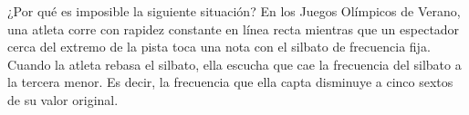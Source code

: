 \item ¿Por qué es imposible la siguiente situación? En los Juegos Olímpicos de Verano, una atleta corre con rapidez constante en línea recta mientras que un espectador cerca del extremo de la pista toca una nota con el silbato de frecuencia fija. Cuando la atleta rebasa el silbato, ella escucha que cae la frecuencia del silbato a la tercera menor. Es decir, la frecuencia que ella capta disminuye a cinco sextos de su valor original.